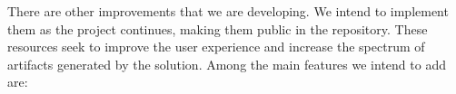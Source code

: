 There are other improvements that we are developing.
We intend to implement them as the project continues, making them public in the repository.
These resources seek to improve the user experience and increase the spectrum of artifacts generated by the solution.
Among the main features we intend to add are:

